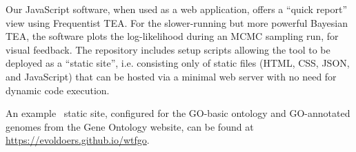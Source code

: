 
Our JavaScript software, when used as a web application,
offers a ``quick report'' view using Frequentist TEA.
For the slower-running but more powerful Bayesian TEA, the software plots the log-likelihood during an MCMC sampling run, for visual feedback.
The repository includes setup scripts allowing the tool to be deployed as a ``static site'',
i.e. consisting only of static files (HTML, CSS, JSON, and JavaScript) that can be hosted via a minimal web server with no need for dynamic code execution.

An example \wtfgenes\ static site, configured for the GO-basic ontology and GO-annotated genomes from the Gene Ontology website,
can be found at \url{https://evoldoers.github.io/wtfgo}.
